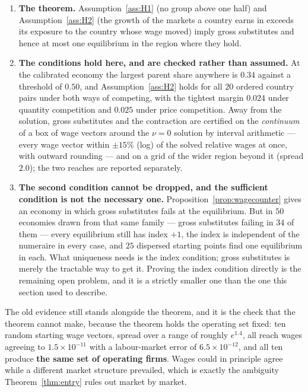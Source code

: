 \documentclass[11pt]{article}
\theoremstyle{plain}
\theoremstyle{remark}
\theoremstyle{definition}
\begin{document}
\begin{enumerate}
\item \textbf{The theorem.} Assumption~\ref{ass:H1} (no group above one half) and
Assumption~\ref{ass:H2} (the growth of the markets a country earns in exceeds its
exposure to the country whose wage moved) imply gross substitutes and hence at most one
equilibrium in the region where they hold.

\item \textbf{The conditions hold here, and are checked rather than assumed.} At the
calibrated economy the largest parent share anywhere is $0.34$ against a threshold of
$0.50$, and Assumption~\ref{ass:H2} holds for all $20$ ordered country pairs under both
ways of competing, with the tightest margin $0.024$ under quantity competition and
$0.025$ under price competition. Away from the solution, gross substitutes and the
contraction are certified on the \emph{continuum} of a box of wage vectors around the
$\nu=0$ solution by interval arithmetic --- every wage vector within $\pm15\%$ (log)
of the solved relative wages at once, with outward rounding --- and on a grid of the
wider region beyond it (spread $2.0$); the two reaches are reported separately.

\item \textbf{The second condition cannot be dropped, and the sufficient condition is
not the necessary one.} Proposition~\ref{prop:wagecounter} gives an economy in which
gross substitutes fails at the equilibrium. But in $50$ economies drawn from that same
family --- gross substitutes failing in $34$ of them --- every equilibrium still has
index $+1$, the index is independent of the numeraire in every case, and $25$ dispersed
starting points find one equilibrium in each. What uniqueness needs is the index
condition; gross substitutes is merely the tractable way to get it. Proving the index
condition directly is the remaining open problem, and it is a strictly smaller one than
the one this section used to describe.
\end{enumerate}

\noindent The old evidence still stands alongside the theorem, and it is the check that
the theorem cannot make, because the theorem holds the operating set fixed: ten random
starting wage vectors, spread over a range of roughly $e^{1.4}$, all reach wages
agreeing to $1.5\times10^{-11}$ with a labour-market error of $6.5\times10^{-12}$, and
all ten produce \textbf{the same set of operating firms}. Wages could in principle agree
while a different market structure prevailed, which is exactly the ambiguity
Theorem~\ref{thm:entry} rules out market by market.
\end{document}
